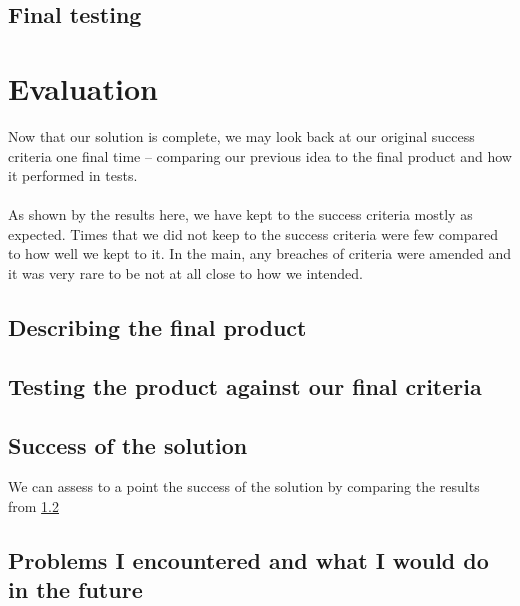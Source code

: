 \documentclass[9pt]{article}
\begin{document}
\subsection{Final testing}








\newpage
\section{Evaluation}
Now that our solution is complete, we may look back at our original success criteria one final time -- comparing our previous idea to the final product and how it performed in tests.\\\\
As shown by the results here, we have kept to the success criteria mostly as expected. Times that we did not keep to the success criteria were few compared to how well we kept to it. In the main, any breaches of criteria were amended and it was very rare to be not at all close to how we intended.


\newpage
\subsection{Describing the final product}


\newpage
\subsection{Testing the product against our final criteria}\label{ssc_testingFinal}




\newpage
\subsection{Success of the solution}
We can assess to a point the success of the solution by comparing the results from \ref{ssc_testingFinal}



\newpage
\subsection{Problems I encountered and what I would do in the future}











\newpage
{}


\newpage
\listoffigures
\end{document}
